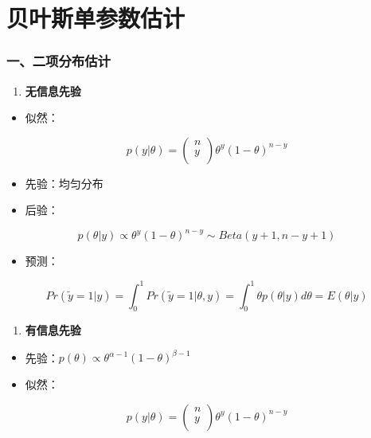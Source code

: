 \section{贝叶斯单参数估计}
\subsubsection{一、二项分布估计}

\begin{enumerate}
\def\labelenumi{\arabic{enumi}.}
\item
  \textbf{无信息先验}
\end{enumerate}

\begin{itemize}
\item
  似然：
\end{itemize}

\begin{equation} 
p(y|\theta)=
\left(                 
  \begin{array}{ccc}   
    n\\ 
    y\\  
  \end{array}
\right)                 
\theta^y(1-\theta)^{n-y}
\end{equation}

\begin{itemize}
\item
  先验：均匀分布
\item
  后验：
\end{itemize}

\[p(\theta|y)\propto\theta^y(1-\theta)^{n-y}\sim Beta(y+1,n-y+1)\]

\begin{itemize}
\item
  预测：
\end{itemize}

\[Pr(\widetilde y=1|y)=\int_0^1Pr(\widetilde y=1|\theta,y)
=\int_0^1\theta p(\theta|y)d\theta=E(\theta|y)\]

\begin{enumerate}
\def\labelenumi{\arabic{enumi}.}
\item
  \textbf{有信息先验}
\end{enumerate}

\begin{itemize}
\item
  先验：\(p(\theta)\propto \theta^{\alpha-1}(1-\theta)^{\beta-1}\)
\item
  似然：
\end{itemize}
\begin{equation}      
p(y|\theta)=
\left(                 
  \begin{array}{ccc}   
    n\\ 
    y\\  
  \end{array}
\right)                 
\theta^y(1-\theta)^{n-y}
\end{equation}


